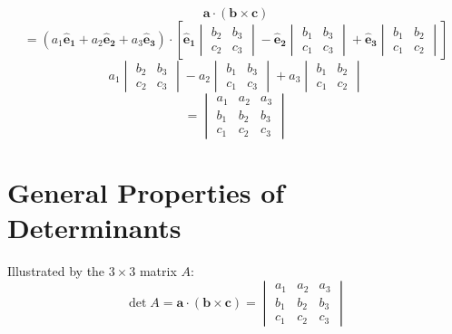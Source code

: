 \documentclass{article}
\renewcommand{\vec}[1]{\bm{#1}}
\newcommand{\vv}[1]{\vec{#1}}
\newcommand{\ve}[1]{\vec{\hat{e}_{#1}}}
\begin{document}
\[\vv a\cdot(\vv b\times\vv c)\]
\[=(a_1\ve1+a_2\ve2+a_3\ve3)\cdot\left[\ve1
\begin{vmatrix}
b_2 & b_3\\
c_2 & c_3
\end{vmatrix}
-\ve2
\begin{vmatrix}
b_1 & b_3\\
c_1 & c_3
\end{vmatrix}
+\ve3
\begin{vmatrix}
b_1 & b_2\\
c_1 & c_2
\end{vmatrix}
\right]\]
\[a_1
\begin{vmatrix}
b_2 & b_3\\
c_2 & c_3
\end{vmatrix}
-a_2
\begin{vmatrix}
b_1 & b_3\\
c_1 & c_3
\end{vmatrix}
+a_3
\begin{vmatrix}
b_1 & b_2\\
c_1 & c_2
\end{vmatrix}\]
\[=
\begin{vmatrix}
a_1 & a_2 & a_3\\
b_1 & b_2 & b_3\\
c_1 & c_2 & c_3
\end{vmatrix}
\]

\section{General Properties of Determinants}

Illustrated by the \(3\times3\) matrix \(A\):
\[\det A=\vv a\cdot(\vv b\times\vv c)=
   \begin{vmatrix}
      a_1 & a_2 & a_3\\
      b_1 & b_2 & b_3\\
      c_1 & c_2 & c_3
   \end{vmatrix}
\]
\end{document}

